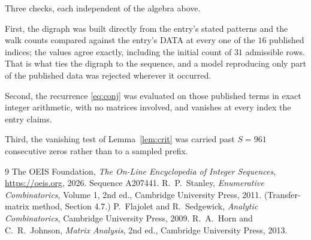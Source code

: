 \documentclass[11pt,a4paper]{article}
\theoremstyle{plain}
\theoremstyle{definition}
\begin{document}
Three checks, each independent of the algebra above.

First, the digraph was built directly from the entry's stated patterns and the walk counts
compared against the entry's DATA at every one of the $16$ published indices; the
values agree exactly, including the initial count of $31$ admissible rows. That is
what ties the digraph to the sequence, and a model reproducing only part of the published
data was rejected wherever it occurred.

Second, the recurrence \eqref{eq:conj} was evaluated on those published terms in exact
integer arithmetic, with no matrices involved, and vanishes at every index the entry claims.

Third, the vanishing test of Lemma~\ref{lem:crit} was carried past $S=961$ consecutive
zeros rather than to a sampled prefix.

\begin{thebibliography}{9}
 The OEIS Foundation, \emph{The On-Line Encyclopedia of Integer
Sequences}, \url{https://oeis.org}, 2026. Sequence A207441.
 R.~P.~Stanley, \emph{Enumerative Combinatorics}, Volume 1, 2nd ed.,
Cambridge University Press, 2011. (Transfer-matrix method, Section 4.7.)
 P.~Flajolet and R.~Sedgewick, \emph{Analytic Combinatorics}, Cambridge
University Press, 2009.
 R.~A.~Horn and C.~R.~Johnson, \emph{Matrix Analysis}, 2nd ed., Cambridge
University Press, 2013.
\end{thebibliography}
\end{document}
